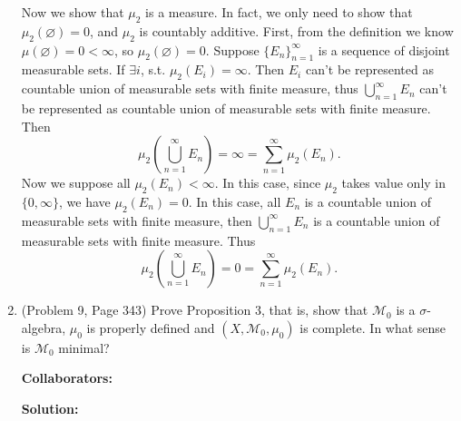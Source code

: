 \documentclass{article}%
\begin{document}
\begin{enumerate}
Now we show that $\mu_2$ is a measure. In fact, we only need to show that $\mu_2(\varnothing) = 0$, and $\mu_2$ is countably additive. First, from the definition we know $\mu(\varnothing) = 0 < \infty$, so $\mu_2(\varnothing) = 0$. Suppose $\{E_n\}_{n=1}^{\infty}$ is a sequence of disjoint measurable sets. If $\exists i$, s.t. $\mu_2(E_i) = \infty$. Then $E_i$ can't be represented as countable union of measurable sets with finite measure, thus $\bigcup\limits_{n=1}^{\infty}E_n $ can't be represented as countable union of measurable sets with finite measure. Then
$$
\mu_2\left(\bigcup_{n=1}^{\infty}E_n\right) = \infty = \sum_{n=1}^{\infty}\mu_2(E_n).
$$
Now we suppose all $\mu_2(E_n) < \infty$. In this case, since $\mu_2$ takes value only in $\{0, \infty\}$, we have $\mu_2(E_n) = 0$. In this case, all $E_n$ is a countable union of measurable sets with finite measure, then $\bigcup\limits_{n=1}^{\infty}E_n $ is a countable union of measurable sets with finite measure. Thus
$$
\mu_2\left(\bigcup_{n=1}^{\infty}E_n\right) = 0 = \sum_{n=1}^{\infty}\mu_2(E_n).
$$
\bigskip


\item (Problem 9, Page 343) Prove Proposition 3, that is, show that $\mathcal{M}_0$ is a $\sigma$-algebra, $\mu_0$ is properly defined and $(X,\mathcal{M}_0, \mu_0)$ is complete.  In what sense is $\mathcal{M}_0$ minimal?


\bigskip
\textbf{Collaborators:}\\
\smallskip
 
\textbf{Solution:}
\bigskip



\end{enumerate}
\end{document}
